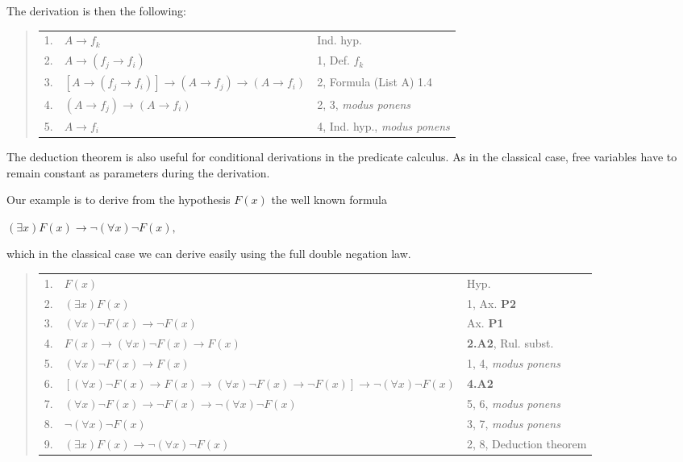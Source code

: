 \documentclass[12pt]{article}
\begin{document}
\begin{itemize}
The derivation is then the following:

\begin{quote}
\begin{tabular}{lll}
1.&$A \rightarrow f_k$&Ind. hyp.\\
2.&$A \rightarrow (f_j \rightarrow f_i )$&1, Def. $f_k$\\
3.&$[A \rightarrow (f_j \rightarrow f_i)] \rightarrow (A \rightarrow f_j) \rightarrow ( A \rightarrow f_i)$&2, Formula (List A) 1.4\\
4.&$(A \rightarrow f_j) \rightarrow (A \rightarrow f_i)$&2, 3, \emph{modus ponens}\\
5.&$A \rightarrow f_i$&4, Ind. hyp., \emph{modus ponens}
\end{tabular}
\end{quote}                                     

\end{itemize}

The deduction theorem is also useful for conditional derivations in the predicate calculus. As in the classical case,  free variables have to remain constant as parameters during the derivation.
 
Our example is to derive from the hypothesis $F (x)$ the well known formula 

\begin{center}
$(\exists x) F (x) \rightarrow \neg (\forall x) \neg F (x),$
\end{center}

which in the classical case we can derive easily using the full double negation law.

\begin{quote}
\begin{tabular}{lll}
1.&$F (x)$&Hyp.\\
2.&$(\exists x) F (x)$&1, Ax. \textbf{P2}\\
3.&$(\forall x) \neg F (x) \rightarrow \neg F (x)$&Ax. \textbf{P1}\\
4.&$F (x) \rightarrow (\forall x) \neg F (x) \rightarrow  F (x)$&\textbf{2.A2}, Rul. subst.\\
5.&$(\forall x) \neg F (x) \rightarrow F (x)$&1, 4, \emph{modus ponens}\\
6.&$[(\forall x) \neg F (x) \rightarrow F (x) \rightarrow (\forall x) \neg F (x) \rightarrow \neg F (x)] \rightarrow \neg (\forall x) \neg F (x)$&\textbf{4.A2}\\
7.&$(\forall x) \neg F (x) \rightarrow \neg F (x) \rightarrow \neg (\forall x) \neg F (x)$&5, 6, \emph{modus ponens}\\
8.&$\neg (\forall x) \neg F (x)$&3, 7, \emph{modus ponens}\\
9.&$(\exists x) F (x) \rightarrow \neg (\forall x) \neg F (x)$&2, 8, Deduction theorem
\end{tabular}
\end{quote}
\end{document}
